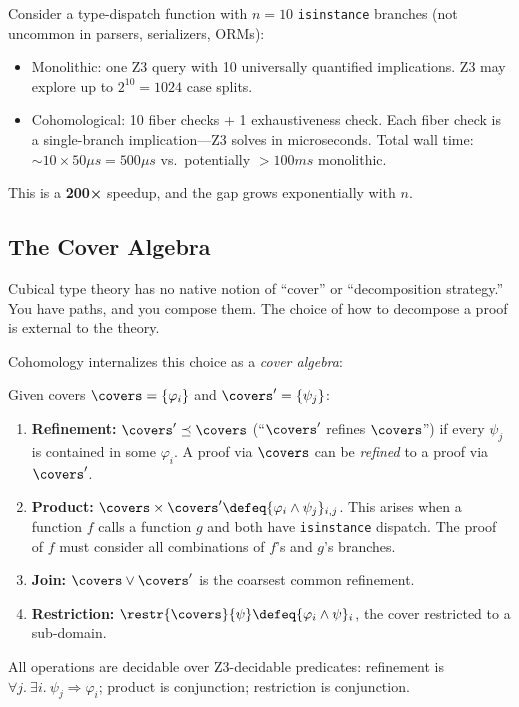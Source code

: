 \begin{example}
\label{ex:speedup}
Consider a type-dispatch function with $n = 10$ \texttt{isinstance}
branches (not uncommon in parsers, serializers, ORMs):
\begin{itemize}
\item Monolithic: one Z3 query with 10 universally quantified
  implications.  Z3 may explore up to $2^{10} = 1024$ case splits.
\item Cohomological: 10 fiber checks + 1 exhaustiveness check.
  Each fiber check is a single-branch implication—Z3 solves
  in microseconds.  Total wall time: $\sim 10 \times 50\mu s
  = 500\mu s$ vs.\ potentially $> 100ms$ monolithic.
\end{itemize}
This is a \textbf{200×} speedup, and the gap grows exponentially
with $n$.
\end{example}


\subsection{The Cover Algebra}
\label{sec:cover-algebra}

Cubical type theory has no native notion of ``cover'' or
``decomposition strategy.''  You have paths, and you compose them.
The choice of how to decompose a proof is external to the theory.

Cohomology internalizes this choice as a \emph{cover algebra}:

\begin{definition}
\label{def:cover-ops}
Given covers $\covers = \{\varphi_i\}$ and $\covers' = \{\psi_j\}$:
\begin{enumerate}
\item \textbf{Refinement:} $\covers' \preceq \covers$ (``$\covers'$
  refines $\covers$'') if every $\psi_j$ is contained in some
  $\varphi_i$.  A proof via $\covers$ can be \emph{refined} to
  a proof via $\covers'$.

\item \textbf{Product:} $\covers \times \covers' \defeq
  \{\varphi_i \wedge \psi_j\}_{i,j}$.  This arises when a
  function $f$ calls a function $g$ and both have
  \texttt{isinstance} dispatch.  The proof of $f$ must
  consider all combinations of $f$'s and $g$'s branches.

\item \textbf{Join:} $\covers \vee \covers'$ is the coarsest
  common refinement.

\item \textbf{Restriction:} $\restr{\covers}{\psi} \defeq
  \{\varphi_i \wedge \psi\}_i$, the cover restricted to a
  sub-domain.
\end{enumerate}
All operations are decidable over Z3-decidable predicates:
refinement is $\forall j.\ \exists i.\ \psi_j \Rightarrow \varphi_i$;
product is conjunction; restriction is conjunction.
\end{definition}

